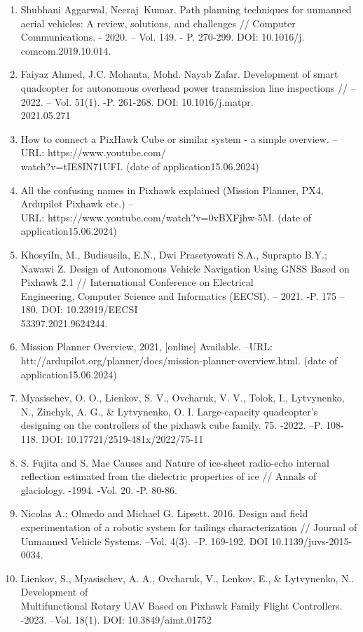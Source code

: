 \begin{noparindent}

\begin{enumerate}
\def\labelenumi{\arabic{enumi}.}
\item
  Shubhani Aggarwal, Neeraj~Kumar. Path planning techniques for unmanned
  aerial vehicles: A review, solutions, and challenges // Computer
  Communications. - 2020. -- Vol. 149. - P. 270-299. DOI:
  10.1016/j.\\comcom.2019.10.014.
\item
  Faiyaz Ahmed, J.C. Mohanta, Mohd. Nayab Zafar. Development of smart
  quadcopter for autonomous overhead power transmission line inspections
  // -- 2022. -- Vol. 51(1). -P. 261-268. DOI:
  10.1016/j.matpr.\\2021.05.271
\item
  How to connect a PixHawk Cube or similar system - a simple overview.
  --URL: https://www.youtube.com/\\watch?v=tIE8IN71UFI. (date of
  application15.06.2024)
\item
  All the confusing names in \textquotesingle Pixhawk\textquotesingle{}
  explained (Mission Planner, PX4, Ardupilot Pixhawk etc.) --\\URL:
  https://www.youtube.com/watch?v=0vBXFjhw-5M. (date of
  application15.06.2024)
\item
  Khosyi\textquotesingle In, M., Budisusila, E.N., Dwi Prasetyowati
  S.A., Suprapto B.Y.; Nawawi Z. Design of Autonomous Vehicle Navigation
  Using GNSS Based on Pixhawk 2.1 // International Conference on
  Electrical \\Engineering, Computer Science and Informatics
  (EECSI)\emph{.} -- 2021. -P. 175 -- 180. DOI:
  10.23919/EECSI\\53397.2021.9624244.
\item
  Mission Planner Overview, 2021, {[}online{]} Available. --URL:
  htt://ardupilot.org/planner/docs/mission-planner-overview.html. (date
  of application15.06.2024)
\item
  Myasischev, O. O., Lienkov, S. V., Ovcharuk, V. V., Tolok, I.,
  Lytvynenko, N., Zinchyk, A. G., \& Lytvynenko, O. I. Large-capacity
  quadcopter's designing on the controllers of the pixhawk cube family.
  75. -2022. --P. 108-118. DOI: 10.17721/2519-481x/2022/75-11
\item
  S. Fujita and S. Mae Causes and Nature of ice-sheet radio-echo
  internal reflection estimated from the dielectric properties of ice //
  Annals of glaciology. -1994. -Vol. 20. -P. 80-86.
\item
  Nicolas A.; Olmedo and Michael G. Lipsett. 2016. Design and field
  experimentation of a robotic system for tailings characterization //
  Journal of Unmanned Vehicle Systems. --Vol. 4(3). --P. 169-192. DOI
  10.1139/juvs-2015-0034.
\item
  Lienkov, S., Myasischev, A. A., Ovcharuk, V., Lenkov, E., \&
  Lytvynenko, N.. Development of \\Multifunctional Rotary UAV Based on
  Pixhawk Family Flight Controllers. -2023. --Vol. 18(1). DOI:
  10.3849/aimt.01752
\end{enumerate}
\end{noparindent}

